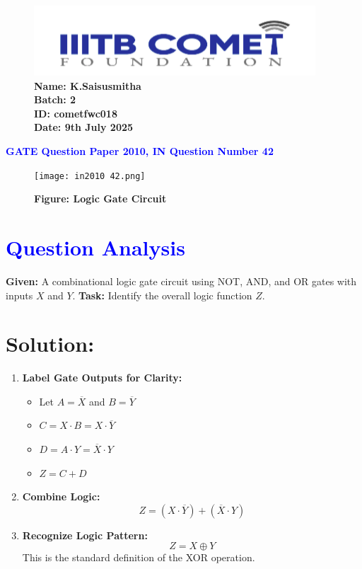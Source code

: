\documentclass[twocolumn]{article}
\begin{document}
\begin{figure}[t]
    \includegraphics[width=\linewidth]{img3.png} %
                \textbf{Name: K.Saisusmitha} \\
    \textbf{Batch: 2} \\
    \textbf{ID: cometfwc018} \\
    \textbf{Date: 9th July 2025}
\end{figure}

\begin{center}
    {\LARGE \textbf{\textcolor{blue}{GATE Question Paper 2010, IN Question Number 42}}}
\end{center}

\vspace{1em}
\begin{figure}[h]
    \centering
    \texttt{[image: in2010 42.png]}
    \caption*{\textbf{Figure: Logic Gate Circuit}}
\end{figure}

\section*{\textcolor{blue}{Question Analysis}}
\textbf{Given:} A combinational logic gate circuit using NOT, AND, and OR gates with inputs $X$ and $Y$.  
\textbf{Task:} Identify the overall logic function $Z$.

\section*{Solution:}

\begin{enumerate}[label=\textbf{Step \arabic*:}]
    \item \textbf{Label Gate Outputs for Clarity:}
    \begin{itemize}
        \item Let $A = \overline{X}$ and $B = \overline{Y}$
        \item $C = X \cdot B = X \cdot \overline{Y}$
        \item $D = A \cdot Y = \overline{X} \cdot Y$
        \item $Z = C + D$
    \end{itemize}

    \item \textbf{Combine Logic:}
    \[
    Z = (X \cdot \overline{Y}) + (\overline{X} \cdot Y)
    \]

    \item \textbf{Recognize Logic Pattern:}
    \[
    Z = X \oplus Y
    \]
    This is the standard definition of the XOR operation.
\end{enumerate}
\end{document}
